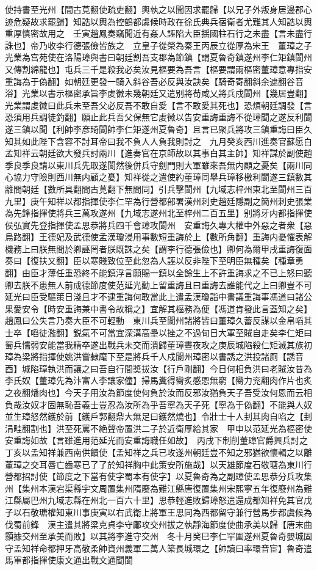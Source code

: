 使持書至光州【間古莧翻使疏吏翻】輿執之以聞因求罷歸【以兄子外叛身居邊郡心迹危疑故求罷歸】知誥以輿為控鶴都虞候時政在徐氏典兵宿衛者尤難其人知誥以輿重厚慎密故用之　壬寅趙鳳奏竊聞近有姦人誣陷大臣揺國柱石行之未盡【言未盡行誅也】帝乃收李行德張儉皆族之　立皇子從榮為秦王丙辰立從厚為宋王　董璋之子光業為宫苑使在洛陽璋與書曰朝廷割吾支郡為節鎮【謂夏魯奇鎮遂州李仁矩鎮閬州又傳割綿龍也】屯兵三千是殺我必矣汝見樞要為吾言【樞要謂兩樞密董璋意專指安重誨為于偽翻】如朝廷更發一騎入斜谷吾必反與汝訣矣【騎奇寄翻斜余遮翻谷音浴】光業以書示樞密承旨李䖍徽未幾朝廷又遣别將荀咸乂將兵戍閬州【幾居豈翻】光業謂䖍徽曰此兵未至吾父必反吾不敢自愛【言不敢愛其死也】恐煩朝廷調發【言恐須用兵調徒釣翻】願止此兵吾父保無它䖍徽以告安重誨重誨不從璋聞之遂反利閬遂三鎮以聞【利帥李彦琦閬帥李仁矩遂州夏魯奇】且言已聚兵將攻三鎮重誨曰臣久知其如此陛下含容不討耳帝曰我不負人人負我則討之　九月癸亥西川進奏官蘇愿白孟知祥云朝廷欲大發兵討兩川【進奏官在京師故以其事白其主帥】知祥謀於副使趙季良季良請以東川兵先取遂閬然後併兵守劍門則大軍雖來吾無内顧之憂矣【兩川同心協力守險則西川無内顧之憂】知祥從之遣使約董璋同舉兵璋移檄利閬遂三鎮數其離間朝廷【數所具翻間古莧翻下無間同】引兵擊閬州【九域志梓州東北至閬州三百九里】庚午知祥以都指揮使李仁罕為行營都部署漢州刺史趙廷隱副之簡州刺史張業為先鋒指揮使將兵三萬攻遂州【九域志遂州北至梓州二百五里】别將牙内都指揮使侯弘實先登指揮使孟思恭將兵四千會璋攻閬州　安重誨久專大權中外惡之者衆【惡烏路翻】王德妃及武德使孟漢瓊浸用事數短重誨於上【數所角翻】重誨内憂懼表解機務上曰朕無間於卿誣罔者朕既誅之矣【謂李行德張儉也】卿何為爾甲戌重誨復面奏曰【復扶又翻】臣以寒賤致位至此忽為人誣以反非陛下至明臣無種矣【種章勇翻】由臣才薄任重恐終不能鎮浮言願賜一鎮以全餘生上不許重誨求之不已上怒曰聽卿去朕不患無人前成德節度使范延光勸上留重誨且曰重誨去誰能代之上曰卿豈不可延光曰臣受驅策日淺且才不逮重誨何敢當此上遣孟漢瓊詣中書議重誨事馮道曰諸公果愛安令【時安重誨兼中書令故稱之】宜解其樞務為便【馮道肯發此言蓋知之矣】趙鳳曰公失言乃奏大臣不可輕動　東川兵至閬州諸將皆曰董璋久蓄反謀以金帛㗖其士卒【㗖徒濫翻】鋭氣不可當宜深溝高壘以挫之不過旬日大軍至賊自走矣李仁矩曰蜀兵懦弱安能當我精卒遂出戰兵未交而潰歸董璋晝夜攻之庚辰城陷殺仁矩滅其族初璋為梁將指揮使姚洪嘗隸麾下至是將兵千人戍閬州璋密以書誘之洪投諸厠【誘音酉】城陷璋執洪而讓之曰吾自行間奬拔汝【行戶剛翻】今日何相負洪曰老賊汝昔為李氏奴【董璋先為汴富人李讓家僮】掃馬糞得臠炙感恩無窮【臠力兖翻肉作片也炙之夜翻燔肉也】今天子用汝為節度使何負於汝而反邪汝猶負天子吾受汝何恩而云相負哉汝奴才固無恥吾義士豈忍為汝所為乎吾寧為天子死【寧為于偽翻】不能與人奴並生璋怒然鑊於前【鑊戶郭翻鼎大無足曰鑊然燒也】令壯士十人刲其肉自啗之【刲涓畦翻割也】洪至死罵不絶聲帝置洪二子於近衛厚給其家　甲申以范延光為樞密使安重誨如故【言雖進用范延光而安重誨職任如故】　丙戌下制削董璋官爵興兵討之丁亥以孟知祥兼西南供饋使【孟知祥之兵已攻遂州朝廷豈不知之邪猶欲懷輯之以離董璋之交耳唇亡齒寒已了了於知祥胸中此策安所施哉】以天雄節度石敬瑭為東川行營都招討使【節度之下當有使字蜀本有使字】以夏魯奇為之副璋使孟思恭分兵攻集州【集州本漢宕渠縣宇文周置集州隋廢為難江縣唐復置集州宋熙寧五年復廢州為難江縣屬巴州九域志縣在州北一百六十里】思恭輕進敗歸璋怒遣還成都知祥免其官戊子以石敬瑭權知東川事庚寅以右武衛上將軍王思同為西都留守兼行營馬步都虞候為伐蜀前鋒　漢主遣其將梁克貞李守鄘攻交州拔之執靜海節度使曲承美以歸【唐末曲顥據交州至承美而敗】以其將李進守交州　冬十月癸巳李仁罕圍遂州夏魯奇嬰城固守孟知祥命都押牙高敬柔帥資州義軍二萬人築長城環之【帥讀曰率環音宦】魯奇遣馬軍都指揮使康文通出戰文通聞閬